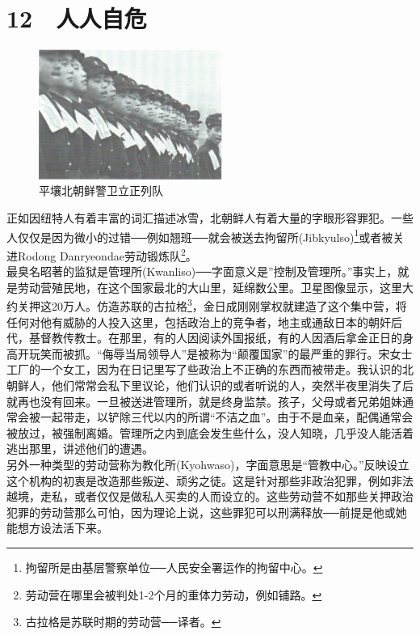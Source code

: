 \fancyhead[RO]{\thepage}
\fancyhead[LE]{\thepage}
\fancyfoot[LE,RO]{}
\fancyfoot[LO,CE]{}
\fancyfoot[CO,RE]{}
\chapter*{12 {\FA } 人人自危}
\begin{figure}[!htbp]
	\centering
	\includegraphics[width=6cm]{./Chapters/Images/12.jpg}
	\caption*{平壤北朝鲜警卫立正列队}
\end{figure}


正如因纽特人有着丰富的词汇描述冰雪，北朝鲜人有着大量的字眼形容罪犯。一些人仅仅是因为微小的过错──例如翘班──就会被送去拘留所(Jibkyulso)\footnote{拘留所是由基层警察单位──人民安全署运作的拘留中心。}或者被关进Rodong Danryeondae劳动锻炼队\footnote{劳动营在哪里会被判处1-2个月的重体力劳动，例如铺路。}。\\

最臭名昭著的监狱是管理所(Kwanliso)──字面意义是”控制及管理所。”事实上，就是劳动营殖民地，在这个国家最北的大山里，延绵数公里。卫星图像显示，这里大约关押这20万人。仿造苏联的古拉格\footnote{古拉格是苏联时期的劳动营──译者。}，金日成刚刚掌权就建造了这个集中营，将任何对他有威胁的人投入这里，包括政治上的竞争者，地主或通敌日本的朝奸后代，基督教传教士。在那里，有的人因阅读外国报纸，有的人因酒后拿金正日的身高开玩笑而被抓。“侮辱当局领导人”是被称为“颠覆国家”的最严重的罪行。宋女士工厂的一个女工，因为在日记里写了些政治上不正确的东西而被带走。我认识的北朝鲜人，他们常常会私下里议论，他们认识的或者听说的人，突然半夜里消失了后就再也没有回来。一旦被送进管理所，就是终身监禁。孩子，父母或者兄弟姐妹通常会被一起带走，以铲除三代以内的所谓“不洁之血”。由于不是血亲，配偶通常会被放过，被强制离婚。管理所之内到底会发生些什么，没人知晓，几乎没人能活着逃出那里，讲述他们的遭遇。\\

另外一种类型的劳动营称为教化所(Kyohwaso)，字面意思是“管教中心。”反映设立这个机构的初衷是改造那些叛逆、顽劣之徒。这是针对那些非政治犯罪，例如非法越境，走私，或者仅仅是做私人买卖的人而设立的。这些劳动营不如那些关押政治犯罪的劳动营那么可怕，因为理论上说，这些罪犯可以刑满释放──前提是他或她能想方设法活下来。\\


